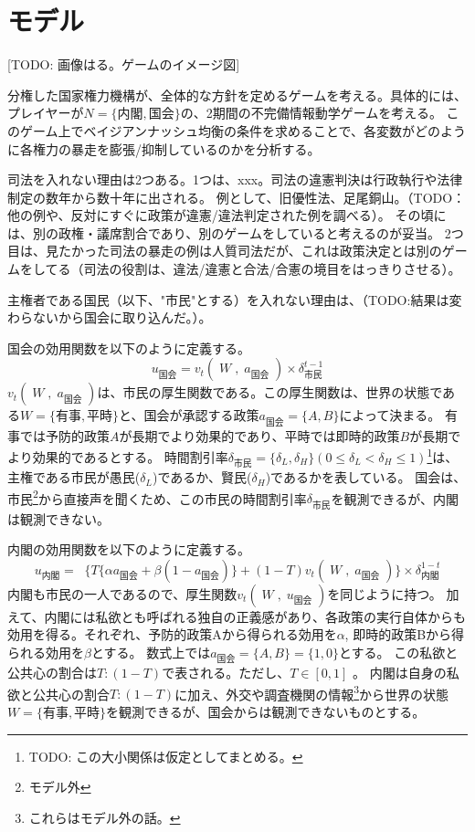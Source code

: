 \documentclass[main.tex]{subfiles}
\begin{document}
\section{モデル}

[TODO: 画像はる。ゲームのイメージ図]

分権した国家権力機構が、全体的な方針を定めるゲームを考える。具体的には、
プレイヤーが$N=\lbrace 内閣, 国会 \rbrace$の、2期間の不完備情報動学ゲームを考える。
このゲーム上でベイジアンナッシュ均衡の条件を求めることで、各変数がどのように各権力の暴走を膨張/抑制しているのかを分析する。



司法を入れない理由は2つある。1つは、xxx。司法の違憲判決は行政執行や法律制定の数年から数十年に出される。
例として、旧優性法、足尾銅山。（TODO：他の例や、反対にすぐに政策が違憲/違法判定された例を調べる）。
その頃には、別の政権・議席割合であり、別のゲームをしていると考えるのが妥当。
2つ目は、見たかった司法の暴走の例は人質司法だが、これは政策決定とは別のゲームをしてる（司法の役割は、違法/違憲と合法/合憲の境目をはっきりさせる）。

主権者である国民（以下、"市民"とする）を入れない理由は、（TODO:結果は変わらないから国会に取り込んだ。）。


国会の効用関数を以下のように定義する。
$$u_\text{国会} = v_t(\;W\;,\; a_\text{国会}\;) × \delta^{t-1}_\text{市民}$$
$v_t(\;W\;,\; a_\text{国会}\;)$は、市民の厚生関数である。この厚生関数は、世界の状態である$W=\lbrace 有事, 平時\rbrace$と、国会が承認する政策$a_{国会}=\lbrace A, B\rbrace$によって決まる。
有事では予防的政策$A$が長期でより効果的であり、平時では即時的政策$B$が長期でより効果的であるとする。
時間割引率$\delta_{市民}=\lbrace \delta_L, \delta_H \rbrace (0\le \delta_L<\delta_H \le 1)$\footnote{TODO: この大小関係は仮定としてまとめる。}は、主権である市民が愚民($\delta_L$)であるか、賢民($\delta_H$)であるかを表している。
国会は、市民\footnote{モデル外}から直接声を聞くため、この市民の時間割引率$\delta_{市民}$を観測できるが、内閣は観測できない。

内閣の効用関数を以下のように定義する。
$$ u_\text{内閣} =\;\; \lbrace T\lbrace \alpha a_\text{国会} + \beta (1-a_\text{国会}) \rbrace  + (1-T)v_t(\;W\;,\; a_\text{国会}\;) \rbrace × \delta^{1-t}_{内閣}$$
内閣も市民の一人であるので、厚生関数$v_t(\;W\;,\; u_\text{国会}\;)$を同じように持つ。
加えて、内閣には私欲とも呼ばれる独自の正義感があり、各政策の実行自体からも効用を得る。それぞれ、予防的政策Aから得られる効用を$\alpha$, 即時的政策Bから得られる効用を$\beta$とする。
数式上では$a_{国会}=\lbrace A, B\rbrace = \lbrace 1,0\rbrace$とする。
この私欲と公共心の割合は$T:(1-T)$で表される。ただし、$T\in[0,1]$ 。
内閣は自身の私欲と公共心の割合$T:(1-T)$に加え、外交や調査機関の情報\footnote{これらはモデル外の話。}から世界の状態$W=\lbrace 有事, 平時\rbrace$を観測できるが、国会からは観測できないものとする。
\end{document}
